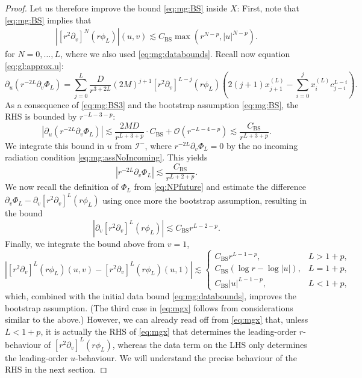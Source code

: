 \documentclass[11pt,english]{article}
\numberwithin{equation}{section}
\theoremstyle{remark}
\theoremstyle{plain}
\theoremstyle{remark}
\newcommand{\pu}{\partial_u}
\newcommand{\pv}{\partial_v}
\renewcommand{\(}{\left(}
\renewcommand{\)}{\right)}
\begin{document}
\begin{proof}
Let us therefore improve the bound \eqref{eq:mg:BS} inside $X$:
First, note that \eqref{eq:mg:BS} implies that
\begin{align}\label{eq:mg:BS3}
\left|[r^2\pv]^{N}(r\phi_L)\right|(u,v)\lesssim C_{\mathrm{BS}} \max(r^{N-p},|u|^{N-p}).
\end{align}
for $N=0,\dots,L$, where we also used \eqref{eq:mg:databounds}.
Recall now equation \eqref{eq:gl:approx.u}:
\begin{equation}
\pu(r^{-2L}\pv\Phi_L)
=\sum_{j=0}^L\frac{D}{r^{3+2L}}(2M)^{j+1}[r^2\pv]^{L-j}(r\phi_{L})\left(2(j+1)x^{(L)}_{j+1}-\sum_{i=0}^j x_i^{(L)} c_{j-i}^{L-i}\right) .
\end{equation}
As a consequence of \eqref{eq:mg:BS3} and the bootstrap assumption \eqref{eq:mg:BS}, the RHS is bounded by $r^{-L-3-p}$:
\begin{equation}
\left|\pu(r^{-2L}\pv\Phi_L)\right|\lesssim \frac{2MD}{r^{L+3+p}}\cdot C_{\mathrm{BS}}+\mathcal O(r^{-L-4-p})\lesssim \frac{C_{\mathrm{BS}}}{r^{L+3+p}}.
\end{equation}
We integrate this bound in $u$ from $\mathcal I^-$, where $r^{-2L}\pv\Phi_L=0$ by the no incoming radiation condition \eqref{eq:mg:assNoIncoming}. This yields
\begin{equation}
\left|r^{-2L}\pv\Phi_L\right|\lesssim \frac{C_{\mathrm{BS}}}{r^{L+2+p}}.
\end{equation}
We now recall the definition of $\Phi_L$ from \eqref{eq:NPfuture} and estimate the difference $\pv\Phi_L-\pv[r^2\pv]^L(r\phi_L)$ using once more the bootstrap assumption, resulting in the bound
\begin{equation}
\left|\pv[r^2\pv]^L(r\phi_L)\right|\lesssim C_{\mathrm{BS}}r^{L-2-p}.
\end{equation}
Finally, we integrate the bound above from $v=1$, 
\begin{equation}\label{eq:mgx}
\left|[r^2\pv]^L(r\phi_L)(u,v)-[r^2\pv]^L(r\phi_L)(u,1)\right|\lesssim\begin{cases} C_{\mathrm{BS}}r^{L-1-p},& L> 1+p,\\
C_{\mathrm{BS}}(\log r-\log |u|), & L=1+p,\\
C_{\mathrm{BS}}|u|^{L-1-p}, & L<1+p,\end{cases}
\end{equation}
which, combined with the initial data bound \eqref{eq:mg:databounds}, improves the bootstrap assumption. 
(The third case in \eqref{eq:mgx} follows from considerations similar to the above.)
However, we can already read off from \eqref{eq:mgx} that, unless $L<1+p$, it is actually the RHS of \eqref{eq:mgx} that determines the leading-order $r$-behaviour of $[r^2\pv]^L(r\phi_L)$, whereas
the data term on the LHS only determines the leading-order $u$-behaviour. 
We will understand the precise behaviour of the RHS in the next section.

\end{proof}
\end{document}
